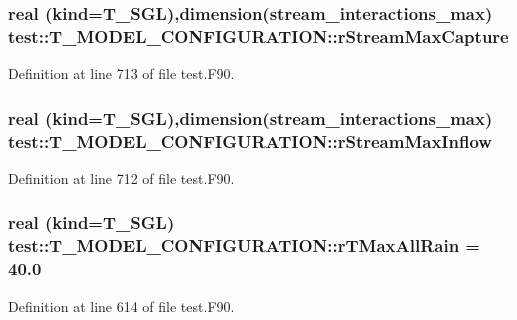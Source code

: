 \hypertarget{typetest_1_1_t___m_o_d_e_l___c_o_n_f_i_g_u_r_a_t_i_o_n_a3b1d464775bde1a336d570653e7f558b}{
\subsubsection[{rStreamMaxCapture}]{\setlength{\rightskip}{0pt plus 5cm}real (kind={\bf T\_\-SGL}),dimension(stream\_\-interactions\_\-max) {\bf test::T\_\-MODEL\_\-CONFIGURATION::rStreamMaxCapture}}}
\label{typetest_1_1_t___m_o_d_e_l___c_o_n_f_i_g_u_r_a_t_i_o_n_a3b1d464775bde1a336d570653e7f558b}


Definition at line 713 of file test.F90.

\hypertarget{typetest_1_1_t___m_o_d_e_l___c_o_n_f_i_g_u_r_a_t_i_o_n_a552c15fcde40fd7dde9097a1b9ce1fd6}{
\subsubsection[{rStreamMaxInflow}]{\setlength{\rightskip}{0pt plus 5cm}real (kind={\bf T\_\-SGL}),dimension(stream\_\-interactions\_\-max) {\bf test::T\_\-MODEL\_\-CONFIGURATION::rStreamMaxInflow}}}
\label{typetest_1_1_t___m_o_d_e_l___c_o_n_f_i_g_u_r_a_t_i_o_n_a552c15fcde40fd7dde9097a1b9ce1fd6}


Definition at line 712 of file test.F90.

\hypertarget{typetest_1_1_t___m_o_d_e_l___c_o_n_f_i_g_u_r_a_t_i_o_n_a4e479ef5ead0f22df7bb6b6e131a71f8}{
\subsubsection[{rTMaxAllRain}]{\setlength{\rightskip}{0pt plus 5cm}real (kind={\bf T\_\-SGL}) {\bf test::T\_\-MODEL\_\-CONFIGURATION::rTMaxAllRain} = 40.0}}
\label{typetest_1_1_t___m_o_d_e_l___c_o_n_f_i_g_u_r_a_t_i_o_n_a4e479ef5ead0f22df7bb6b6e131a71f8}


Definition at line 614 of file test.F90.

